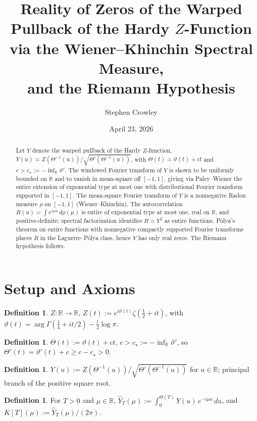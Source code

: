 \documentclass[11pt,a4paper]{article}
\title{Reality of Zeros of the Warped Pullback of the Hardy $Z$-Function\\via the Wiener--Khinchin Spectral Measure,\\and the Riemann Hypothesis}
\author{Stephen Crowley}
\date{April 23, 2026}
\theoremstyle{plain}
\theoremstyle{definition}
\newtheorem{definition}[theorem]{Definition}
\theoremstyle{remark}
\newcommand{\R}{\mathbb{R}}
\begin{document}
\maketitle

\begin{abstract}
Let $Y$ denote the warped pullback of the Hardy $Z$-function, $Y(u)=Z(\Theta^{-1}(u))/\sqrt{\Theta'(\Theta^{-1}(u))}$, with $\Theta(t)=\vartheta(t)+ct$ and $c>c_\star:=-\inf_\R\vartheta'$. The windowed Fourier transform of $Y$ is shown to be uniformly bounded on $\R$ and to vanish in mean-square off $[-1,1]$, giving via Paley--Wiener the entire extension of exponential type at most one with distributional Fourier transform supported in $[-1,1]$. The mean-square Fourier transform of $Y$ is a nonnegative Radon measure $\rho$ on $[-1,1]$ (Wiener--Khinchin). The autocorrelation $R(u)=\int e^{i\mu u}\,d\rho(\mu)$ is entire of exponential type at most one, real on $\R$, and positive-definite; spectral factorization identifies $R=Y^2$ as entire functions. P\'olya's theorem on entire functions with nonnegative compactly supported Fourier transforms places $R$ in the Laguerre--P\'olya class, hence $Y$ has only real zeros. The Riemann hypothesis follows.
\end{abstract}

\section{Setup and Axioms}

\begin{definition}\label{def:Z}
$Z:\R\to\R$, $Z(t):=e^{i\vartheta(t)}\zeta(\tfrac12+it)$, with $\vartheta(t)=\arg\Gamma(\tfrac14+it/2)-\tfrac{t}{2}\log\pi$.
\end{definition}

\begin{definition}\label{def:Theta}
$\Theta(t):=\vartheta(t)+ct$, $c>c_\star:=-\inf_\R\vartheta'$, so $\Theta'(t)=\vartheta'(t)+c\ge c-c_\star>0$.
\end{definition}

\begin{definition}\label{def:Y}
$Y(u):=Z(\Theta^{-1}(u))/\sqrt{\Theta'(\Theta^{-1}(u))}$ for $u\in\R$; principal branch of the positive square root.
\end{definition}

\begin{definition}\label{def:K}
For $T>0$ and $\mu\in\R$, $\hat Y_T(\mu):=\int_0^{\Theta(T)}Y(u)\,e^{-i\mu u}\,du$, and $K[T](\mu):=\hat Y_T(\mu)/(2\pi)$.
\end{definition}
\end{document}
